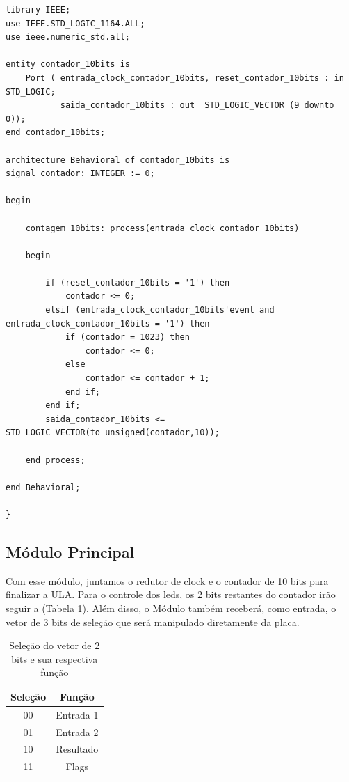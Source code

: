 \documentclass[a4paper,12pt,twoside]{article}
\begin{document}
\begin{lstlisting}
library IEEE;
use IEEE.STD_LOGIC_1164.ALL;
use ieee.numeric_std.all;

entity contador_10bits is
    Port ( entrada_clock_contador_10bits, reset_contador_10bits : in  STD_LOGIC;
           saida_contador_10bits : out  STD_LOGIC_VECTOR (9 downto 0));
end contador_10bits;

architecture Behavioral of contador_10bits is
signal contador: INTEGER := 0;

begin

	contagem_10bits: process(entrada_clock_contador_10bits)

	begin 
	
		if (reset_contador_10bits = '1') then
			contador <= 0;
		elsif (entrada_clock_contador_10bits'event and  entrada_clock_contador_10bits = '1') then
			if (contador = 1023) then
				contador <= 0;
			else
				contador <= contador + 1;
			end if;
		end if; 	
		saida_contador_10bits <= STD_LOGIC_VECTOR(to_unsigned(contador,10));
	
	end process;
	
end Behavioral;

} \end{lstlisting}
\subsection{Módulo Principal}
    Com esse módulo, juntamos o redutor de clock e o contador de 10 bits para finalizar a ULA. Para o controle dos leds, os 2 bits restantes do contador irão seguir a (Tabela \ref{tabela2}). Além disso, o Módulo também receberá, como entrada, o vetor de 3 bits de seleção que será manipulado diretamente da placa.
    
\begin{table}[H]
\begin{tabular}{|c||c|} \hline
Seleção & Função \\\hline
00 &  Entrada 1 \\\hline
01 & Entrada 2 \\\hline
10 & Resultado \\\hline
11 & Flags \\\hline
 
\end{tabular}
\label{tabela2}
\centering
\caption{Seleção do vetor de 2 bits e sua respectiva função}
\label {tabela2}
\end{table}
\end{document}
